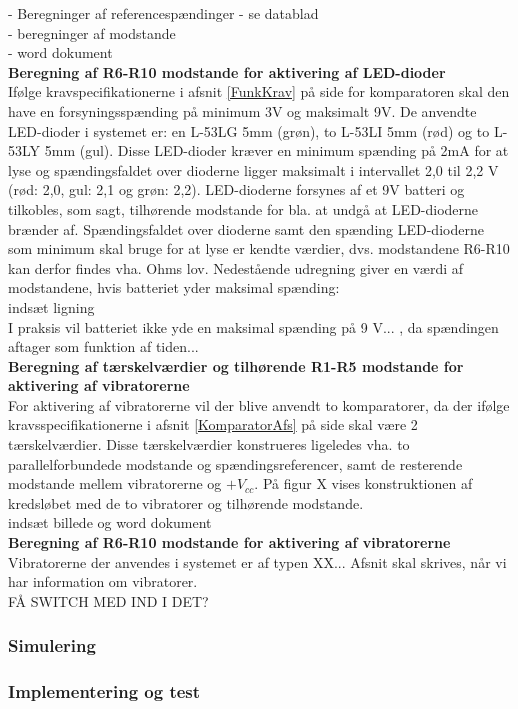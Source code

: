 - Beregninger af referencespændinger - se datablad \\
- beregninger af modstande \\
- word dokument \\

\noindent\textbf{Beregning af R6-R10 modstande for aktivering af LED-dioder} \\
Ifølge kravspecifikationerne i afsnit \ref{FunkKrav}  på side \pageref{FunkKrav} for komparatoren skal den have en forsyningsspænding på minimum 3V og maksimalt 9V. De anvendte LED-dioder i systemet er: en L-53LG 5mm (grøn), to L-53LI 5mm (rød) og to L-53LY 5mm (gul). Disse LED-dioder kræver en minimum spænding på 2mA for at lyse og spændingsfaldet over dioderne ligger maksimalt i intervallet 2,0 til 2,2 V (rød: 2,0, gul: 2,1 og grøn: 2,2). LED-dioderne forsynes af et 9V batteri og tilkobles, som sagt, tilhørende modstande for bla. at undgå at LED-dioderne brænder af. Spændingsfaldet over dioderne samt den spænding LED-dioderne som minimum skal bruge for at lyse er kendte værdier, dvs. modstandene R6-R10 kan derfor findes vha. Ohms lov. Nedestående udregning giver en værdi af modstandene, hvis batteriet yder maksimal spænding: \\

indsæt ligning \\

I praksis vil batteriet ikke yde en maksimal spænding på 9 V... , da spændingen aftager som funktion af tiden... \\

\noindent\textbf{Beregning af tærskelværdier og tilhørende R1-R5 modstande for aktivering af  vibratorerne} \\
For aktivering af vibratorerne vil der blive anvendt to komparatorer, da der ifølge kravsspecifikationerne i afsnit \ref{KomparatorAfs} på side \pageref{KomparatorAfs} skal være 2 tærskelværdier. Disse tærskelværdier konstrueres ligeledes vha. to parallelforbundede modstande og spændingsreferencer, samt de resterende modstande mellem vibratorerne og $+V_{cc}$. På figur X vises konstruktionen af kredsløbet med de to vibratorer og tilhørende modstande. \\

indsæt billede og word dokument \\

\noindent\textbf{Beregning af R6-R10 modstande for aktivering af vibratorerne} \\
Vibratorerne der anvendes i systemet er af typen XX... Afsnit skal skrives, når vi har information om vibratorer.  \\

FÅ SWITCH MED IND I DET? \\

\subsubsection{Simulering}
\subsubsection{Implementering og test}
